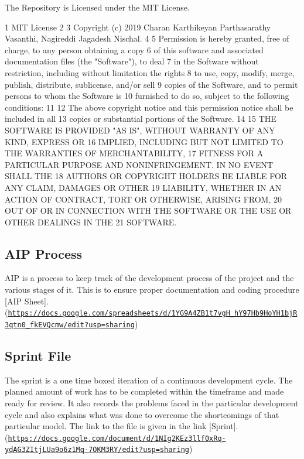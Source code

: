 The Repository is Licensed under the M\+IT License. 
\begin{DoxyCode}
1 MIT License
2 
3 Copyright (c) 2019 Charan Karthikeyan Parthasarathy Vasanthi, Nagireddi Jagadesh Nischal.
4 
5 Permission is hereby granted, free of charge, to any person obtaining a copy
6 of this software and associated documentation files (the "Software"), to deal
7 in the Software without restriction, including without limitation the rights
8 to use, copy, modify, merge, publish, distribute, sublicense, and/or sell
9 copies of the Software, and to permit persons to whom the Software is
10 furnished to do so, subject to the following conditions:
11 
12 The above copyright notice and this permission notice shall be included in all
13 copies or substantial portions of the Software.
14 
15 THE SOFTWARE IS PROVIDED "AS IS", WITHOUT WARRANTY OF ANY KIND, EXPRESS OR
16 IMPLIED, INCLUDING BUT NOT LIMITED TO THE WARRANTIES OF MERCHANTABILITY,
17 FITNESS FOR A PARTICULAR PURPOSE AND NONINFRINGEMENT. IN NO EVENT SHALL THE
18 AUTHORS OR COPYRIGHT HOLDERS BE LIABLE FOR ANY CLAIM, DAMAGES OR OTHER
19 LIABILITY, WHETHER IN AN ACTION OF CONTRACT, TORT OR OTHERWISE, ARISING FROM,
20 OUT OF OR IN CONNECTION WITH THE SOFTWARE OR THE USE OR OTHER DEALINGS IN THE
21 SOFTWARE.
\end{DoxyCode}


\subsection*{A\+IP Process}

A\+IP is a process to keep track of the development process of the project and the various stages of it. This is to ensure proper documentation and coding procedure \mbox{[}A\+IP Sheet\mbox{]}.(\href{https://docs.google.com/spreadsheets/d/1YG9A4ZB1t7vgH_hY97Hb9HoYH1bjR3qtn0_fkEVQcmw/edit?usp=sharing}{\tt https\+://docs.\+google.\+com/spreadsheets/d/1\+Y\+G9\+A4\+Z\+B1t7vg\+H\+\_\+h\+Y97\+Hb9\+Ho\+Y\+H1bj\+R3qtn0\+\_\+fk\+E\+V\+Qcmw/edit?usp=sharing})

\subsection*{Sprint File}

The sprint is a one time boxed iteration of a continuous development cycle. The planned amount of work has to be completed within the timeframe and made ready for review. It also records the problems faced in the particular development cycle and also explains what was done to overcome the shortcomings of that particular model. The link to the file is given in the link \mbox{[}Sprint\mbox{]}.(\href{https://docs.google.com/document/d/1NIg2KEz3llf0xRq-ydAG3ZItjLUa9o6z1Mq-7OKM3RY/edit?usp=sharing}{\tt https\+://docs.\+google.\+com/document/d/1\+N\+Ig2\+K\+Ez3llf0x\+Rq-\/yd\+A\+G3\+Z\+Itj\+L\+Ua9o6z1\+Mq-\/7\+O\+K\+M3\+R\+Y/edit?usp=sharing})

